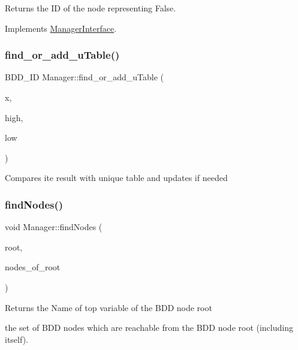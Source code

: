 \begin{DoxyReturn}{Returns}
the ID of the node representing False. 
\end{DoxyReturn}


Implements \hyperlink{classManagerInterface_a8c5b3c1ebadc5c76e40e1648f5d459ca}{Manager\+Interface}.

\mbox{\label{classManager_a35b9aaf1d448fdbdc2020b119d729527}} 
\subsubsection{\texorpdfstring{find\+\_\+or\+\_\+add\+\_\+u\+Table()}{find\_or\_add\_uTable()}}
{\footnotesize\ttfamily B\+D\+D\+\_\+\+ID Manager\+::find\+\_\+or\+\_\+add\+\_\+u\+Table (\begin{DoxyParamCaption}\item[{const B\+D\+D\+\_\+\+ID}]{x,  }\item[{const B\+D\+D\+\_\+\+ID}]{high,  }\item[{const B\+D\+D\+\_\+\+ID}]{low }\end{DoxyParamCaption})}

Compares ite result with unique table and updates if needed \mbox{\label{classManager_a2aefec8f025f8d7417eff8493bcd7f04}} 
\subsubsection{\texorpdfstring{find\+Nodes()}{findNodes()}}
{\footnotesize\ttfamily void Manager\+::find\+Nodes (\begin{DoxyParamCaption}\item[{const B\+D\+D\+\_\+\+ID \&}]{root,  }\item[{std\+::set$<$ B\+D\+D\+\_\+\+ID $>$ \&}]{nodes\+\_\+of\+\_\+root }\end{DoxyParamCaption})\hspace{0.3cm}{\ttfamily [virtual]}}

\begin{DoxyReturn}{Returns}
the Name of top variable of the B\+DD node root 

the set of B\+DD nodes which are reachable from the B\+DD node root (including itself). 
\end{DoxyReturn}


